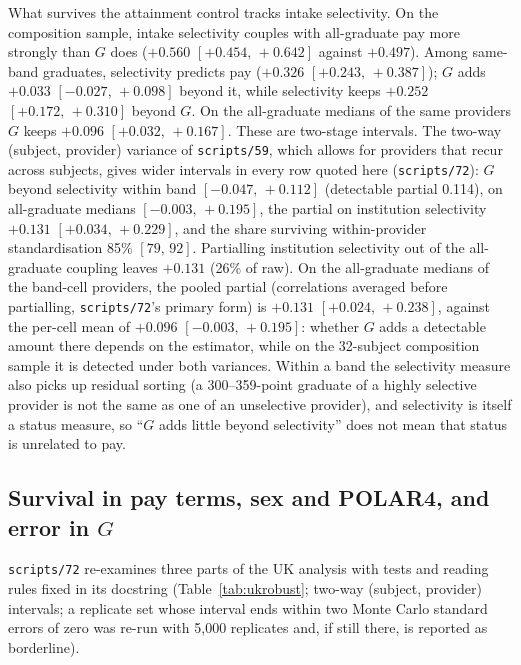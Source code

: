 \documentclass[11pt]{article}
\newcommand{\ci}[2]{$[#1,\allowbreak\,#2]$}
\newcommand{\scr}[1]{\texttt{scripts/#1}}
\begin{document}
What survives the attainment control tracks intake selectivity. On the composition sample, intake selectivity
couples with all-graduate pay more strongly than $G$ does ($+0.560$ \ci{+0.454}{+0.642} against $+0.497$). Among
same-band graduates, selectivity predicts pay ($+0.326$ \ci{+0.243}{+0.387}); $G$ adds $+0.033$ \ci{-0.027}{+0.098}
beyond it, while selectivity keeps $+0.252$ \ci{+0.172}{+0.310} beyond $G$. On the all-graduate medians of the same
providers $G$ keeps $+0.096$ \ci{+0.032}{+0.167}. These are two-stage intervals. The two-way (subject, provider)
variance of \scr{59}, which allows for providers that recur across subjects, gives wider intervals in every row
quoted here (\scr{72}): $G$ beyond selectivity within band \ci{-0.047}{+0.112} (detectable partial 0.114), on all-graduate
medians \ci{-0.003}{+0.195}, the partial on institution selectivity $+0.131$ \ci{+0.034}{+0.229}, and the share
surviving within-provider standardisation 85\% \ci{79}{92}. Partialling institution selectivity out of the all-graduate
coupling leaves $+0.131$ (26\% of raw). On the all-graduate medians of the band-cell providers, the pooled partial
(correlations averaged before partialling, \scr{72}'s primary form) is $+0.131$ \ci{+0.024}{+0.238}, against the
per-cell mean of $+0.096$ \ci{-0.003}{+0.195}: whether $G$ adds a detectable amount there depends on the estimator,
while on the 32-subject composition sample it is detected under both variances. Within a band the selectivity measure also picks up residual sorting (a
300--359-point graduate of a highly selective provider is not the same as one of an unselective provider), and
selectivity is itself a status measure, so ``$G$ adds little beyond selectivity'' does not mean that status is
unrelated to pay.

\subsection{Survival in pay terms, sex and POLAR4, and error in \texorpdfstring{$G$}{G}}\label{sec:ukrobust}

\scr{72} re-examines three parts of the UK analysis with tests and reading rules fixed in its docstring
(Table~\ref{tab:ukrobust}; two-way (subject, provider) intervals; a replicate set whose interval ends within two Monte
Carlo standard errors of zero was re-run with 5,000 replicates and, if still there, is reported as borderline).
\end{document}
